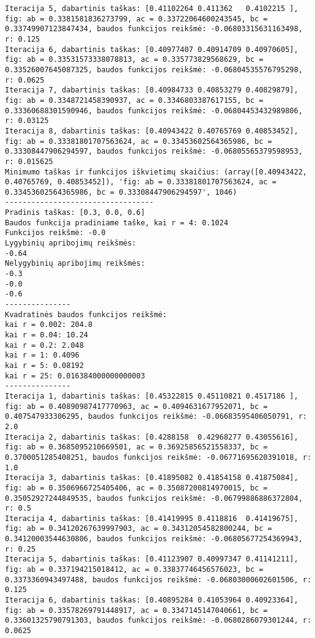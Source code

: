\documentclass[a4paper,12pt,fleqn]{article}
\begin{document}
\begin{verbatim}
Iteracija 5, dabartinis taškas: [0.41102264 0.411362   0.4102215 ], fig: ab = 0.3381581836273799, ac = 0.33722064600243545, bc = 0.33749907123847434, baudos funkcijos reikšmė: -0.06803315631163498, r: 0.125
Iteracija 6, dabartinis taškas: [0.40977407 0.40914709 0.40970605], fig: ab = 0.33531573338078813, ac = 0.335773829568629, bc = 0.33526007645087325, baudos funkcijos reikšmė: -0.06804535576795298, r: 0.0625
Iteracija 7, dabartinis taškas: [0.40984733 0.40853279 0.40829879], fig: ab = 0.3348721458390937, ac = 0.3346803387617155, bc = 0.33360688301590946, baudos funkcijos reikšmė: -0.06804453432989806, r: 0.03125
Iteracija 8, dabartinis taškas: [0.40943422 0.40765769 0.40853452], fig: ab = 0.33381801707563624, ac = 0.33453602564365986, bc = 0.33308447906294597, baudos funkcijos reikšmė: -0.06805565379598953, r: 0.015625
Minimumo taškas ir funkcijos iškvietimų skaičius: (array([0.40943422, 0.40765769, 0.40853452]), 'fig: ab = 0.33381801707563624, ac = 0.33453602564365986, bc = 0.33308447906294597', 1046)
----------------------------------
Pradinis taškas: [0.3, 0.0, 0.6]
Baudos funkcija pradiniame taške, kai r = 4: 0.1024
Funkcijos reikšmė: -0.0
Lygybinių apribojimų reikšmės:
-0.64
Nelygybinių apribojimų reikšmės:
-0.3
-0.0
-0.6
---------------
Kvadratinės baudos funkcijos reikšmė: 
kai r = 0.002: 204.8
kai r = 0.04: 10.24
kai r = 0.2: 2.048
kai r = 1: 0.4096
kai r = 5: 0.08192
kai r = 25: 0.016384000000000003
---------------
Iteracija 1, dabartinis taškas: [0.45322815 0.45110821 0.4517186 ], fig: ab = 0.40890987417770963, ac = 0.4094631677952071, bc = 0.407547933306295, baudos funkcijos reikšmė: -0.06683595406050791, r: 2.0
Iteracija 2, dabartinis taškas: [0.4288158  0.42968277 0.43055616], fig: ab = 0.3685095210669501, ac = 0.36925856521558337, bc = 0.3700051285408251, baudos funkcijos reikšmė: -0.06771695620391018, r: 1.0
Iteracija 3, dabartinis taškas: [0.41895082 0.41854158 0.41875084], fig: ab = 0.3506966725405406, ac = 0.35087200814970015, bc = 0.35052927244849535, baudos funkcijos reikšmė: -0.06799886886372804, r: 0.5
Iteracija 4, dabartinis taškas: [0.41419995 0.4118816  0.41419675], fig: ab = 0.34120267639997903, ac = 0.34312054582800244, bc = 0.34120003544630806, baudos funkcijos reikšmė: -0.06805677254369943, r: 0.25
Iteracija 5, dabartinis taškas: [0.41123907 0.40997347 0.41141211], fig: ab = 0.337194215018412, ac = 0.33837746456576023, bc = 0.3373360943497488, baudos funkcijos reikšmė: -0.06803000602601506, r: 0.125
Iteracija 6, dabartinis taškas: [0.40895284 0.41053964 0.40923364], fig: ab = 0.33578269791448917, ac = 0.3347145147040661, bc = 0.33601325790791303, baudos funkcijos reikšmė: -0.0680286079301244, r: 0.0625

\end{verbatim}
\end{document}
